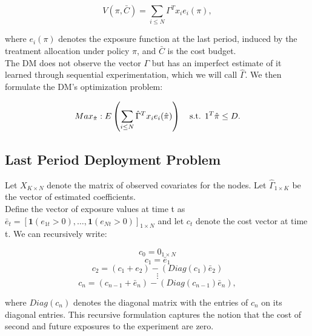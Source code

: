 \documentclass[12pt,a4paper]{article}
\begin{document}
$$V(\pi, \bar{C})=\sum_{i \leq N} \Gamma^T x_i e_i(\pi), $$

where $e_i(\pi)$ denotes the exposure function at the last period, induced by the treatment allocation under policy $\pi$, and $\bar{C}$ is the cost budget. \\

The DM does not observe the vector $\Gamma$ but has an imperfect estimate of it learned through sequential experimentation, which we will call $\hat \Gamma$. We then formulate the DM's optimization problem:

\begin{align}\label{eq:dm_opti}
Max_{\hat \pi} : E \left(\sum_{i \leq N} \hat \Gamma^T x_i e_i(\hat \pi)  \right) \quad \mbox{s.t. } 1^T \hat \pi \leq D .
\end{align}

\iffalse
This ends up being equivalent to this minimization (the equivalence to be clarified later):
%

$$ Min_{\hat \pi} E \left( Sup_\pi \left(\sum_{i \leq N} \Gamma^T x_i e_i(\pi) - c_\infty(\pi) \right) - \sum_{i \leq N} \hat \Gamma^T x_i e_i(\hat \pi) + c_\infty(\hat \pi) \right) $$
%
OR (depending on how $\hat \Gamma \rightarrow \Gamma$).

$$ Min_{\pi} E \left( Sup_\pi \left(\sum_{i \leq N} \Gamma^T x_i e_i(\pi) - c_\infty \right) - \sum_{i \leq N}  \Gamma^T x_i e_i(\pi) + \hat c_\infty \right) $$
\fi

\subsection{Last Period Deployment Problem}

Let $X_{K \times N}$ denote the matrix of observed covariates for the nodes. Let $\hat \Gamma _{1 \times K}$ be the vector of estimated coefficients.\\

Define the vector of exposure values at time t as $\bar e_t=[\mathbf{1}(e_{1t}>0), \dots, \mathbf{1}(e_{Nt}>0)]_{1 \times N}$ and let $c_t$ denote the cost vector at time t.  We can recursively write:

$$c_0 = 0_{1 \times N}$$
$$c_1 = \bar e_1$$
$$c_2 = (c_1 + e_2) - (Diag(c_1)  \bar e_2)$$
$$\vdots$$
$$c_n = (c_{n-1} + \bar e_n) - (Diag(c_{n-1})  \bar e_n), $$

where $Diag(c_n)$ denotes the diagonal matrix with the entries of $c_n$ on its diagonal entries. This recursive formulation captures the notion that the cost of second and future exposures to the experiment are zero.\\
\end{document}
